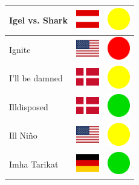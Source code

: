 \documentclass[12pt, a4paper, twoside]{report}
\begin{document}
\begin{center}
\begin{longtable}{|p{5cm}|p{2cm}|p{2cm}|}
 Igel vs. Shark                                             & \includegraphics[width=1cm]{../4x3/at} &   \includegraphics[width=1cm]{../likes/m} \\ \hline
 Ignite                                                     & \includegraphics[width=1cm]{../4x3/us} &   \includegraphics[width=1cm]{../likes/n} \\ \hline
 I'll be damned                                             & \includegraphics[width=1cm]{../4x3/dk} &   \includegraphics[width=1cm]{../likes/m} \\ \hline
 Illdisposed                                                & \includegraphics[width=1cm]{../4x3/dk} &   \includegraphics[width=1cm]{../likes/y} \\ \hline
 Ill Niño                                                   & \includegraphics[width=1cm]{../4x3/us} &   \includegraphics[width=1cm]{../likes/m} \\ \hline
 Imha Tarikat                                               & \includegraphics[width=1cm]{../4x3/de} &   \includegraphics[width=1cm]{../likes/y} \\ \hline

\end{longtable}
\end{center}
\end{document}
